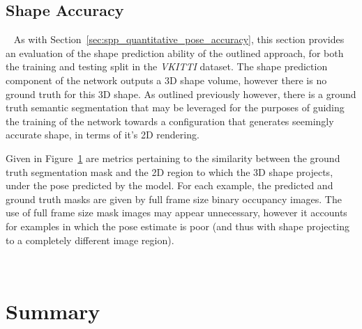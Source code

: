 \subsection{Shape Accuracy}
~\label{sec:spp_quantitative_pose_accuracy}
As with Section~\ref{sec:spp_quantitative_pose_accuracy}, this section provides an evaluation of the shape prediction ability 
of the outlined approach, for both the training and testing split in the \textit{VKITTI} dataset. The shape prediction component 
of the network outputs a 3D shape volume, however there is no ground truth for this 3D shape. As outlined previously however, 
there is a ground truth semantic segmentation that may be leveraged for the purposes of guiding the training of the network towards 
a configuration that generates seemingly accurate shape, in terms of it's 2D rendering. 

Given in Figure~\ref{figure:spp_shape_roc} are metrics pertaining to the similarity between the ground truth segmentation mask and the 2D region to 
which the 3D shape projects, under the pose predicted by the model. For each example, the predicted and ground truth masks are 
given by full frame size binary occupancy images. The use of full frame size mask images may appear unnecessary, however it accounts 
for examples in which the pose estimate is poor (and thus with shape projecting to a completely different image region).

\begin{figure}[!htbp]
  \centering
  \caption[Shape Prediction ROC]{}
~\label{figure:spp_shape_roc}
\end{figure}

\section{Summary}
~\label{sec:spp_discussion}
